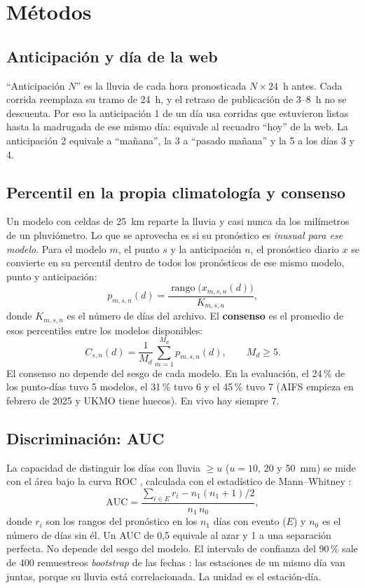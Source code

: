 \documentclass{sosg-informe}
\begin{document}
\section{Métodos}

\subsection{Anticipación y día de la web}
\enquote{Anticipación $N$} es la lluvia de cada hora pronosticada $N \times 24$~h antes. Cada corrida reemplaza su tramo de 24~h, y el retraso de publicación de 3--8~h no se descuenta. Por eso la anticipación 1 de un día usa corridas que estuvieron listas hasta la madrugada de ese mismo día: equivale al recuadro \enquote{hoy} de la web. La anticipación 2 equivale a \enquote{mañana}, la 3 a \enquote{pasado mañana} y la 5 a los días 3 y 4.

\subsection{Percentil en la propia climatología y consenso}
Un modelo con celdas de 25~km reparte la lluvia y casi nunca da los milímetros de un pluviómetro. Lo que se aprovecha es si su pronóstico es \emph{inusual para ese modelo}. Para el modelo $m$, el punto $s$ y la anticipación $n$, el pronóstico diario $x$ se convierte en su percentil dentro de todos los pronósticos de ese mismo modelo, punto y anticipación:
\begin{equation}
  p_{m,s,n}(d) = \frac{\operatorname{rango}\bigl(x_{m,s,n}(d)\bigr)}{K_{m,s,n}},
\end{equation}
donde $K_{m,s,n}$ es el número de días del archivo. El \textbf{consenso} es el promedio de esos percentiles entre los modelos disponibles:
\begin{equation}
  C_{s,n}(d) = \frac{1}{M_d}\sum_{m=1}^{M_d} p_{m,s,n}(d), \qquad M_d \geq 5 .
\end{equation}
El consenso no depende del sesgo de cada modelo. En la evaluación, el 24\,\% de los punto-días tuvo 5 modelos, el 31\,\% tuvo 6 y el 45\,\% tuvo 7 (AIFS empieza en febrero de 2025 y UKMO tiene huecos). En vivo hay siempre 7.

\subsection{Discriminación: AUC}
La capacidad de distinguir los días con lluvia $\geq u$ ($u = 10$, 20 y 50~mm) se mide con el área bajo la curva ROC \citep{fawcett2006}, calculada con el estadístico de Mann--Whitney \citep{mason2002}:
\begin{equation}
  \mathrm{AUC} = \frac{\sum_{i \in E} r_i - n_1(n_1+1)/2}{n_1\, n_0},
\end{equation}
donde $r_i$ son los rangos del pronóstico en los $n_1$ días con evento ($E$) y $n_0$ es el número de días sin él. Un AUC de 0,5 equivale al azar y 1 a una separación perfecta. No depende del sesgo del modelo. El intervalo de confianza del 90\,\% sale de 400 remuestreos \emph{bootstrap} de las fechas \citep{efron1993}: las estaciones de un mismo día van juntas, porque su lluvia está correlacionada. La unidad es el estación-día.
\end{document}
